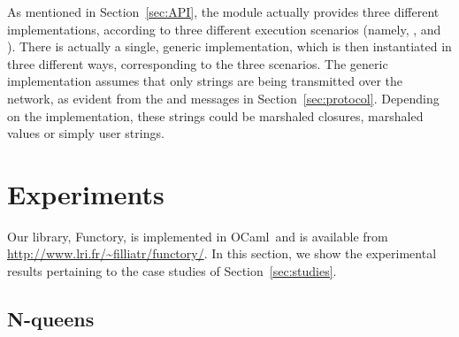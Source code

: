 \documentclass[a4paper,12pt]{article}
\newcommand{\Ocaml}{OCaml}
\newcommand{\functory}{\textsf{Functory}}
\begin{document}
As mentioned in Section~\ref{sec:API}, the  module
actually provides three different implementations, according to three
different execution scenarios (namely, ,  and
). There is
actually a single, generic implementation, which is then instantiated
in three different ways, corresponding to the three scenarios.  The
generic implementation assumes that only strings are being transmitted
over the network, as evident from the  and 
messages in Section~\ref{sec:protocol}. Depending on the
implementation, these strings could be marshaled closures, marshaled
values or simply user strings.


\section{Experiments}\label{sec:experiments}

Our library, \functory, is implemented in \Ocaml\ and is available
from \url{http://www.lri.fr/~filliatr/functory/}.
In this section, we show the experimental results pertaining to the
case studies of Section~\ref{sec:studies}.

\subsection{N-queens}
\end{document}
